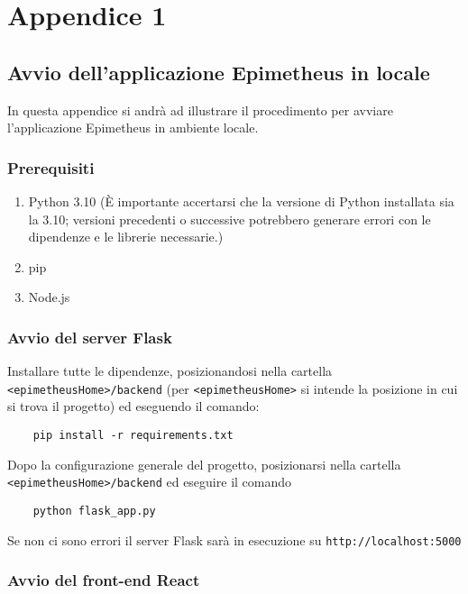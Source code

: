 \chapter*{Appendice 1}
\label{ch:appendice1}

\section*{Avvio dell'applicazione Epimetheus in locale}

In questa appendice si andrà ad illustrare il procedimento per avviare l'applicazione Epimetheus in ambiente locale.

\subsection*{Prerequisiti}
\begin{enumerate}
    \item Python 3.10 (È importante accertarsi che la versione di Python installata sia la 3.10; versioni precedenti o successive potrebbero generare errori con le dipendenze e le librerie necessarie.)
    \item pip
    \item Node.js
\end{enumerate}

\subsection*{Avvio del server Flask}

Installare tutte le dipendenze, posizionandosi nella cartella \verb|<epimetheusHome>/backend| (per \verb|<epimetheusHome>| si intende la posizione in cui si trova il progetto) ed eseguendo il comando:
\begin{verbatim}
    pip install -r requirements.txt  
\end{verbatim}
Dopo la configurazione generale del progetto, posizionarsi nella cartella 
\newline
\verb|<epimetheusHome>/backend| ed eseguire il comando 
\begin{verbatim}
    python flask_app.py 
\end{verbatim}
Se non ci sono errori il server Flask sarà in esecuzione su \verb|http://localhost:5000|

\subsection*{Avvio del front-end React}

